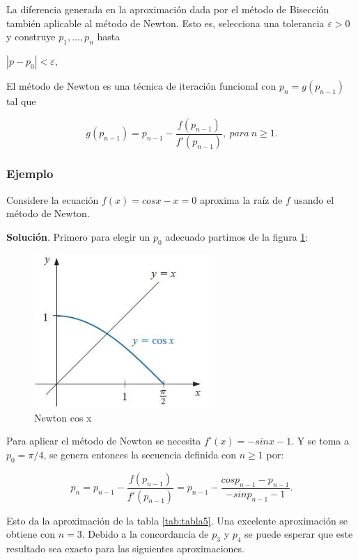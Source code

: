 La diferencia generada en la aproximación dada por el método de Bisección también aplicable al método de Newton. Esto es, selecciona una tolerancia $\varepsilon>0$ y construye $p_1,\dotsc,p_n$ hasta
\begin{center}
    $|p-p_0|<\varepsilon$,
\end{center}

El método de Newton es una técnica de iteración funcional con $p_n=g(p_{n-1})$ tal que 

\begin{equation*}
    g(p_{n-1})= p_{n-1} -\frac{f(p_{n-1})}{f'(p_{n-1})}, \ para \ n\geq 1.
\end{equation*}

\subsubsection*{Ejemplo}
Considere la ecuación $f(x)=cos x-x=0$ aproxima la raíz de $f$ usando el método de Newton.

\textbf{Solución}. Primero para elegir un $p_0$ adecuado partimos de la figura \ref{tab:fig4}:

\begin{figure}[h!]
\centering
  \includegraphics[width=0.6\textwidth]{NewtonE.JPG}
\caption{Newton cos x}
\label{tab:fig4}
\end{figure} 

Para aplicar el método de Newton se necesita $f'(x)=-sinx-1$. Y se toma a $p_0=\pi/4$, se genera entonces la secuencia definida con $n\geq 1$ por:

\begin{equation*}
    p_n= p_{n-1} -\frac{f(p_{n-1})}{f'(p_{n-1})}=p_{n-1} -\frac{cosp_{n-1}-p_{n-1}}{-sinp_{n-1}-1}.
\end{equation*}

Esto da la aproximación de la tabla \ref{tab:tabla5}. Una excelente aproximación se obtiene con $n=3$. Debido a la concordancia de $p_3$ y $p_4$ se puede esperar que este resultado sea exacto para las siguientes aproximaciones. 

